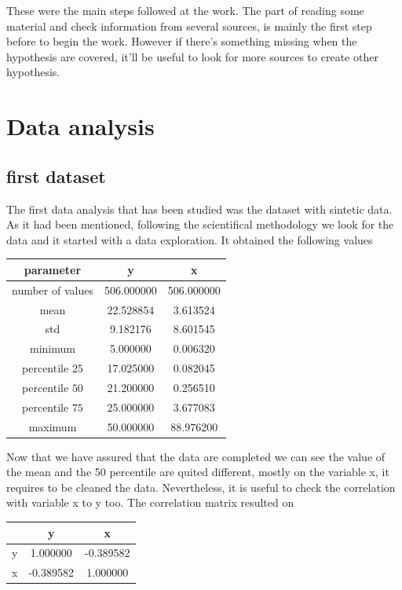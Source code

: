\documentclass{article}
\begin{document}
These were the main steps followed at the work. The part of reading some material and check information from several sources, is mainly the first step before to begin the work. However if there's something missing when the hypothesis are covered, it'll be useful to look for more sources to create other hypothesis.

\section{Data analysis}
\subsection{first dataset}
The first data analysis that has been studied was the dataset with sintetic data. As it had been mentioned, following the scientifical methodology we look for the data and it started with a data exploration.
It obtained the following values 
\begin{center}
  \begin{tabular}{|c|c|c|}
    \hline
   parameter & y & x \\ \hline
   number of values & 506.000000 & 506.000000\\
   mean  &  22.528854  &  3.613524\\
   std   &   9.182176  &  8.601545\\
   minimum   &   5.000000  &  0.006320\\
   percentile $25$   &  17.025000  &  0.082045\\
   percentile $50$   &  21.200000  &  0.256510\\
   percentile $75$   &  25.000000 &   3.677083\\
   maximum   &  50.000000  & 88.976200\\
   \hline
  \end{tabular}
\end{center}
Now that we have assured that the data are completed we can see the value of the mean and the 50 percentile are quited different, mostly on the variable x, it requires to be cleaned the data. Nevertheless, it is useful to check the correlation with variable x to y too.
The correlation matrix resulted on 
\begin{center}
  \begin{tabular}{|c|c|c|}
    \hline
      & y & x  \\ \hline
     y&  1.000000 & -0.389582 \\
     x & -0.389582  & 1.000000 \\
     \hline
  \end{tabular}
\end{center}
\end{document}
